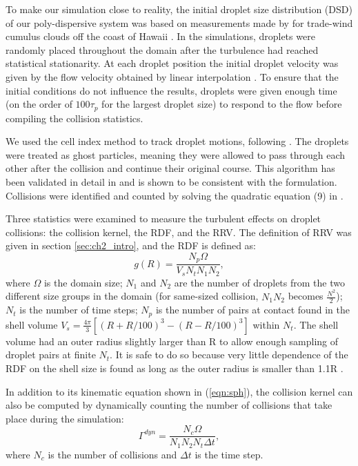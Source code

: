 To make our simulation close to reality, the initial droplet size distribution (DSD) of our poly-dispersive system was based on measurements made by \citet{Squires1958} for trade-wind cumulus clouds off the coast of Hawaii \citep[refer to fig. 5.9 in][]{Rogers1989}. In the simulations, droplets were randomly placed throughout the domain after the turbulence had reached statistical stationarity. At each droplet position the initial droplet velocity was given by the flow velocity obtained by linear interpolation \citep{Yeung1989}. To ensure that the initial conditions do not influence the results, droplets were given enough time (on the order of $100\tau_p$ for the largest droplet size)  to respond to the flow before compiling the collision statistics.


We used the cell index method \citep{Allen1987} to track droplet motions, following \citet{Franklin2005}. The droplets were treated as ghost particles, meaning they were allowed to pass through each other after the collision and continue their original course. This algorithm has been validated in detail in \citet{Franklin2005} and is shown to be consistent with the \citet{Saffman1956} formulation. Collisions were identified and counted by solving the quadratic equation (9) in \citet{Franklin2005}.

Three statistics were examined to measure the turbulent effects on droplet collisions: the collision kernel, the RDF, and the RRV.
The definition of RRV was given in section \ref{sec:ch2_intro}, and the RDF is defined as:
\begin{equation}
g(R)=\frac{N_p\Omega}{V_sN_tN_1N_2},
\end{equation}
where $\Omega$ is the domain size; $N_1$ and $N_2$ are the number of droplets from the two different size groups in the domain (for same-sized collision, $N_1N_2$ becomes $\frac{N^2}{2}$); $N_t$ is the number of time steps; $N_p$ is the number of pairs at contact found in the shell volume $V_s=\frac{4\pi}{3}[(R+R/100)^3-(R-R/100)^3]$ within $N_t$. The shell volume had an outer radius slightly larger than R to allow enough sampling of droplet pairs at finite $N_t$. It is safe to do so because very little dependence of the RDF on the shell size is found as long as the outer radius is smaller than 1.1R \citep{Wang1998b}. 

In addition to its kinematic equation shown in (\ref{eqn:sph}), the collision kernel can also be computed by dynamically counting the number of collisions that take place during the simulation:
\begin{equation}
\Gamma^{dyn}=\frac{N_c\Omega}{N_1N_2N_t\Delta t},
\end{equation}
where $N_c$ is the number of collisions and $\Delta t$ is the time step.

